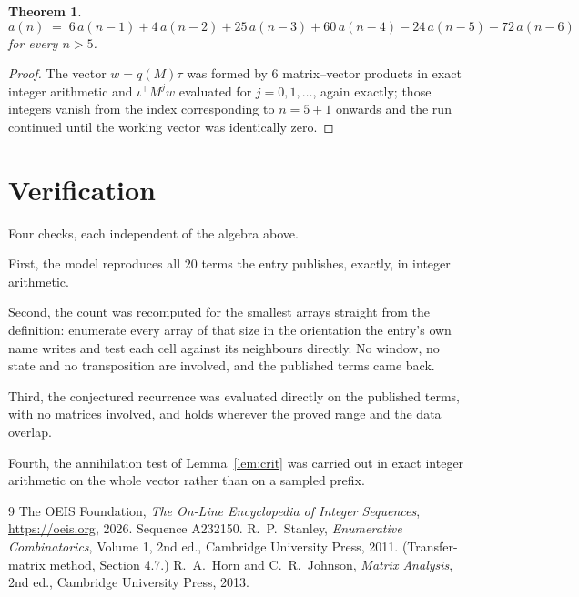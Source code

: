 \documentclass[11pt,a4paper]{article}
\theoremstyle{plain}
\newtheorem{theorem}{Theorem}
\theoremstyle{definition}
\begin{document}
\begin{theorem}
\[
a(n)\;=\;6\,a(n-1) + 4\,a(n-2) + 25\,a(n-3) + 60\,a(n-4) - 24\,a(n-5) - 72\,a(n-6)
\]
for every $n>5$.
\end{theorem}

\begin{proof}
The vector $w=q(M)\tau$ was formed by $6$ matrix--vector products in exact integer
arithmetic and $\iota^{\!\top}M^{j}w$ evaluated for $j=0,1,\dots$, again exactly; those
integers vanish from the index corresponding to $n=5+1$ onwards and the run continued
until the working vector was identically zero.
\end{proof}

\section{Verification}

Four checks, each independent of the algebra above.

First, the model reproduces all $20$ terms the entry publishes, exactly, in integer
arithmetic.

Second, the count was recomputed for the smallest arrays straight from the definition:
enumerate every array of that size in the orientation the entry's own name writes and test each
cell against its neighbours directly. No window, no state and no transposition are involved,
and the published terms came back.

Third, the conjectured recurrence was evaluated directly on the published terms, with no
matrices involved, and holds wherever the proved range and the data overlap.

Fourth, the annihilation test of Lemma~\ref{lem:crit} was carried out in exact integer
arithmetic on the whole vector rather than on a sampled prefix.

\begin{thebibliography}{9}
 The OEIS Foundation, \emph{The On-Line Encyclopedia of Integer
Sequences}, \url{https://oeis.org}, 2026. Sequence A232150.
 R.~P.~Stanley, \emph{Enumerative Combinatorics}, Volume 1, 2nd ed.,
Cambridge University Press, 2011. (Transfer-matrix method, Section 4.7.)
 R.~A.~Horn and C.~R.~Johnson, \emph{Matrix Analysis}, 2nd ed., Cambridge
University Press, 2013.
\end{thebibliography}
\end{document}
